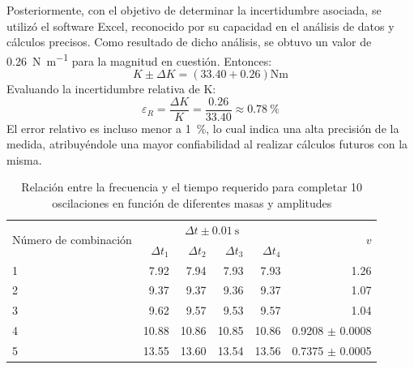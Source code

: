\documentclass[../main.tex]{subfiles}
\begin{document}
Posteriormente, con el objetivo de determinar la incertidumbre asociada, se utilizó el software Excel, reconocido por su capacidad en el análisis de datos y cálculos precisos.
Como resultado de dicho análisis, se obtuvo un valor de \qty{0.26}{\newton\per\metre} para la magnitud en cuestión.
Entonces:
\begin{equation}
  K \pm \Delta K = (\num{33.40} + \num{0.26}) \unit{\newton\metre}
\end{equation}
Evaluando la incertidumbre relativa de K:
\begin{equation}
  \varepsilon_R = \frac{\Delta K}{K} = \frac{\num{0.26}}{\num{33.40}} \approx \qty{0.78}{\percent}
\end{equation}
El error relativo es incluso menor a \qty{1}{\percent}, lo cual indica una alta precisión de la medida, atribuyéndole una mayor confiabilidad al realizar cálculos futuros con la misma.
\begin{table}[H]
  \caption{Relación entre la frecuencia y el tiempo requerido para completar 10 oscilaciones en función de diferentes masas y amplitudes}
  \label{tab:frequence}
  \begin{center}
    \begin{tabular}[c]{lrrrrr}
      \toprule
      \multirow{2}{*}{Número de combinación} &
      \multicolumn{4}{c}{$\Delta t \pm \qty{0.01}{\second}$} &
      \multirow{2}{*}{$v$} \\
      \cmidrule{2-5}
      & $\Delta t_1$
      & $\Delta t_2$
      & $\Delta t_3$
      & $\Delta t_4$ \\
      \midrule
      1 & \num{7.92} & \num{7.94} & \num{7.93} & \num{7.93} & \num{1.26} \\
      2 & \num{9.37} & \num{9.37} & \num{9.36} & \num{9.37} & \num{1.07} \\
      3 & \num{9.62} & \num{9.57} & \num{9.53} & \num{9.57} & \num{1.04} \\
      4 & \num{10.88} & \num{10.86} & \num{10.85} & \num{10.86} & \num{0.9208} $\pm$ \num{0.0008} \\
      5 & \num{13.55} & \num{13.60} & \num{13.54} & \num{13.56} & \num{0.7375} $\pm$ \num{0.0005} \\
      \bottomrule
    \end{tabular}
  \end{center}
\end{table}
\end{document}

